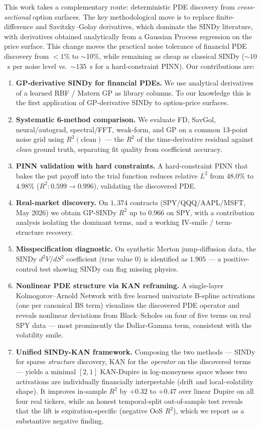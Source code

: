 \documentclass[10pt]{article}
\begin{document}
This work takes a complementary route: deterministic PDE discovery from \emph{cross-sectional} option surfaces. The key methodological move is to replace finite-difference and Savitzky--Golay derivatives, which dominate the SINDy literature, with derivatives obtained analytically from a Gaussian Process regression on the price surface. This change moves the practical noise tolerance of financial PDE discovery from $<1\%$ to $\sim$10\%, while remaining as cheap as classical SINDy ($\sim\!10$~s per noise level vs.\ $\sim\!135$~s for a hard-constraint PINN). Our contributions are:
\begin{enumerate}
\item \textbf{GP-derivative SINDy for financial PDEs.} We use analytical derivatives of a learned RBF / Matern GP as library columns. To our knowledge this is the first application of GP-derivative SINDy to option-price surfaces.
\item \textbf{Systematic 6-method comparison.} We evaluate FD, SavGol, neural/autograd, spectral/FFT, weak-form, and GP on a common 13-point noise grid using $R^2(\text{clean})$ --- the $R^2$ of the time-derivative residual against \emph{clean} ground truth, separating fit quality from coefficient accuracy.
\item \textbf{PINN validation with hard constraints.} A hard-constraint PINN that bakes the put payoff into the trial function reduces relative $L^2$ from $48.0\%$ to $4.98\%$ ($R^2: 0.599 \to 0.996$), validating the discovered PDE.
\item \textbf{Real-market discovery.} On $1{,}374$ contracts (SPY/QQQ/AAPL/MSFT, May 2026) we obtain GP-SINDy $R^2$ up to $0.966$ on SPY, with a contribution analysis isolating the dominant terms, and a working IV-smile / term-structure recovery.
\item \textbf{Misspecification diagnostic.} On synthetic Merton jump-diffusion data, the SINDy $d^2V/dS^2$ coefficient (true value $0$) is identified as $1.905$ --- a positive-control test showing SINDy can flag missing physics.
\item \textbf{Nonlinear PDE structure via KAN reframing.} A single-layer Kolmogorov--Arnold Network with five learned univariate B-spline activations (one per canonical BS term) visualizes the discovered PDE operator and reveals nonlinear deviations from Black--Scholes on four of five terms on real SPY data --- most prominently the Dollar-Gamma term, consistent with the volatility smile.
\item \textbf{Unified SINDy-KAN framework.} Composing the two methods --- SINDy for sparse \emph{structure} discovery, KAN for the \emph{operator} on the discovered terms --- yields a minimal $[2,1]$ KAN-Dupire in log-moneyness space whose two activations are individually financially interpretable (drift and local-volatility shape). It improves in-sample $R^2$ by $+0.32$ to $+0.47$ over linear Dupire on all four real tickers, while an honest temporal-split out-of-sample test reveals that the lift is expiration-specific (negative OoS $R^2$), which we report as a substantive negative finding.
\end{enumerate}
\end{document}
